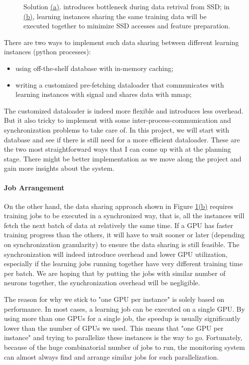 \documentclass[conference]{IEEEtran}
\begin{document}
\begin{figure}[!htb]
	\caption{\small 
		Solution \hyperref[dl_a]{(a)}. introduces bottleneck during data retrival from SSD; 
		in \hyperref[dl_b]{(b)}, learning instances sharing the same training data will be executed together to minimize SSD accesses and feature preparation. }
	\label{fig:dl}
\end{figure}

There are two ways to implement such data sharing between different learning instances (python processes): 

\begin{itemize}
	\item[1.]  using off-the-shelf database with in-memory caching;
	\item[2.]  writing a customized pre-fetching dataloader that communicates with learning instances with signal and shares data with mmap;
\end{itemize}

The customized dataloader is indeed more flexible and introduces less overhead. 
But it also tricky to implement with some inter-process-communication and synchronization problems to take care of. 
In this project, we will start with database and see if there is still need for a more efficient dataloader. 
These are the two most straightforward ways that I can come up with at the planning stage. 
There might be better implementation as we move along the project and gain more insights about the system. 

\paragraph{Job Arrangement}
On the other hand, the data sharing approach shown in Figure \ref{fig:dl}\hyperref[dl_b]{(b)} requires training jobs to be executed in a synchronized way, that is, all the instances will fetch the next batch of data at relatively the same time. 
If a GPU has faster training progress than the others, it will have to wait sooner or later (depending on synchronization granularity) to ensure the data sharing is still feasible. 
The synchronization will indeed introduce overhead and lower GPU utilization, especially if the learning jobs running together have very different training time per batch. 
We are hoping that by putting the jobs with similar number of neurons together, the synchronization overhead will be negligible. 

The reason for why we stick to "one GPU per instance" is solely based on performance. 
In most cases, a learning job can be executed on a single GPU. 
By using more than one GPUs for a single job, the speedup is usually significantly lower than the number of GPUs we used. 
This means that "one GPU per instance" and trying to parallelize these instances is the way to go. 
Fortunately, because of the huge combinatorial number of jobs to run, the monitoring system can almost always find and arrange similar jobs for such parallelization. 
\end{document}
